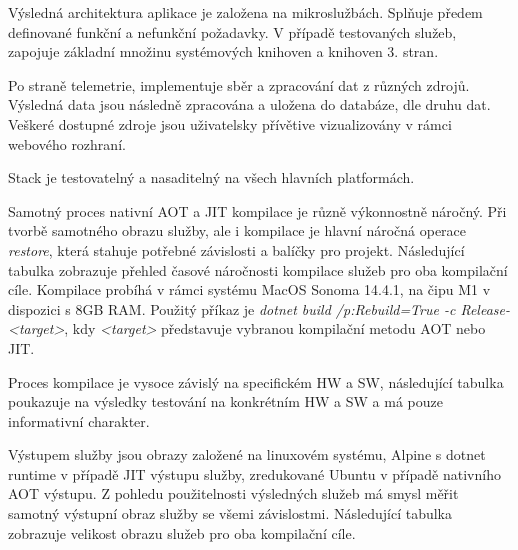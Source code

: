 

Výsledná architektura aplikace je založena na mikroslužbách. Splňuje předem definované funkční a nefunkční požadavky. V případě testovaných služeb, zapojuje základní množinu systémových knihoven a knihoven 3. stran.

Po straně telemetrie, implementuje sběr a zpracování dat z různých zdrojů. Výsledná data jsou následně zpracována a uložena do databáze, dle druhu dat. Veškeré dostupné zdroje jsou uživatelsky přívětive vizualizovány v rámci webového rozhraní.

Stack je testovatelný a nasaditelný na všech hlavních platformách.



Samotný proces nativní AOT a JIT kompilace je různě výkonnostně náročný. Při tvorbě samotného obrazu služby, ale i kompilace je hlavní náročná operace \emph{restore}, která stahuje potřebné závislosti a balíčky pro projekt. Následující tabulka zobrazuje přehled časové náročnosti kompilace služeb pro oba kompilační cíle. Kompilace probíhá v rámci systému MacOS Sonoma 14.4.1, na čipu M1 v dispozici s 8GB RAM. Použitý příkaz je \emph{dotnet build /p:Rebuild=True -c Release-<target>}, kdy \emph{<target>} představuje vybranou kompilační metodu AOT nebo JIT.

Proces kompilace je vysoce závislý na specifickém HW a SW, následující tabulka poukazuje na výsledky testování na konkrétním HW a SW a má pouze informativní charakter.


Výstupem služby jsou obrazy založené na linuxovém systému, Alpine s dotnet runtime v případě JIT výstupu služby, zredukované Ubuntu v případě nativního AOT výstupu. Z pohledu použitelnosti výsledných služeb má smysl měřit samotný výstupní obraz služby se všemi závislostmi. Následující tabulka zobrazuje velikost obrazu služeb pro oba kompilační cíle.

